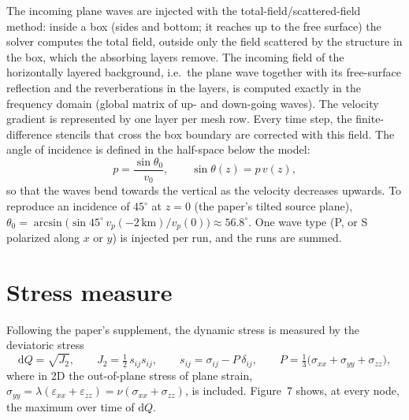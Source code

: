 The incoming plane waves are injected with the total-field/scattered-field method: inside a box (sides and bottom; it
reaches up to the free surface) the solver computes the total field, outside only the field scattered by the structure in
the box, which the absorbing layers remove. The incoming field of the horizontally layered background, i.e.\ the plane
wave together with its free-surface reflection and the reverberations in the layers, is computed exactly in the frequency
domain (global matrix of up- and down-going waves). The velocity gradient is represented by one layer per mesh row.
Every time step, the finite-difference stencils that cross the box boundary are corrected with this field. The angle of
incidence is defined in the half-space below the model:
\begin{equation}
  p = \frac{\sin\theta_0}{v_0}, \qquad \sin\theta(z) = p\, v(z),
  \label{eq:snell}
\end{equation}
so that the waves bend towards the vertical as the velocity decreases upwards. To reproduce an incidence of $45^\circ$ at
$z = 0$ (the paper's tilted source plane), $\theta_0 = \arcsin\!\big(\sin 45^\circ\, v_p(-2\,\mathrm{km})/v_p(0)\big)
\approx 56.8^\circ$. One wave type (P, or S polarized along $x$ or $y$) is injected per run, and the runs are summed.

\section{Stress measure}\label{sec:dq}

Following the paper's supplement, the dynamic stress is measured by the deviatoric stress
\begin{equation}
  \mathrm{d}Q = \sqrt{J_2}, \qquad J_2 = \tfrac12\, s_{ij} s_{ij}, \qquad
  s_{ij} = \sigma_{ij} - P\,\delta_{ij}, \qquad P = \tfrac13\big(\sigma_{xx} + \sigma_{yy} + \sigma_{zz}\big),
  \label{eq:dq}
\end{equation}
where in 2D the out-of-plane stress of plane strain, $\sigma_{yy} = \lambda(\varepsilon_{xx} + \varepsilon_{zz})
= \nu(\sigma_{xx} + \sigma_{zz})$, is included. Figure~7 shows, at every node, the maximum over time of $\mathrm{d}Q$.
